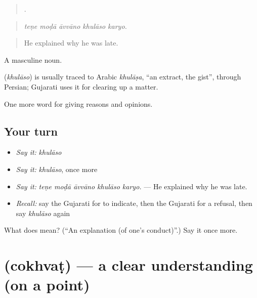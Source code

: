 \begin{quote}
    .
\end{quote}

\begin{quote}
\emph{teṇe moḍā āvvāno khulāso karyo.}
\end{quote}

\begin{quote}
He explained why he was late.
\end{quote}

A masculine noun.

\begin{cousinweb}
\textbf{} (\emph{khulāso}) is usually traced to Arabic \emph{khulāṣa}, \textquotedblleft{}an extract, the gist\textquotedblright{}, through Persian; Gujarati uses it for clearing up a matter.
\end{cousinweb}

\begin{grammarlens}[title={What you've built}]
One more word for giving reasons and opinions.
\end{grammarlens}

\subsection*{Your turn}
\begin{itemize}
\raggedright
  \item \emph{Say it:} \emph{khulāso}
  \item \emph{Say it:} \emph{khulāso}, once more
  \item \emph{Say it:} \emph{teṇe moḍā āvvāno khulāso karyo.} — He explained why he was late.
  \item \emph{Recall:} say the Gujarati for to indicate, then the Gujarati for a refusal, then say \emph{khulāso} again
\end{itemize}

\begin{tcolorbox}[breakable,colback=teal!4,colframe=teal!35!black,title={Before you move on}]
What does  mean? (\textquotedblleft{}An explanation (of one's conduct)\textquotedblright{}.) Say it once more.
\end{tcolorbox}
\section[\texorpdfstring{\gu{ચોખવટ} (cokhvaṭ)}{ચોખવટ (cokhvaṭ)}]{ (cokhvaṭ) — a clear understanding (on a point)}

